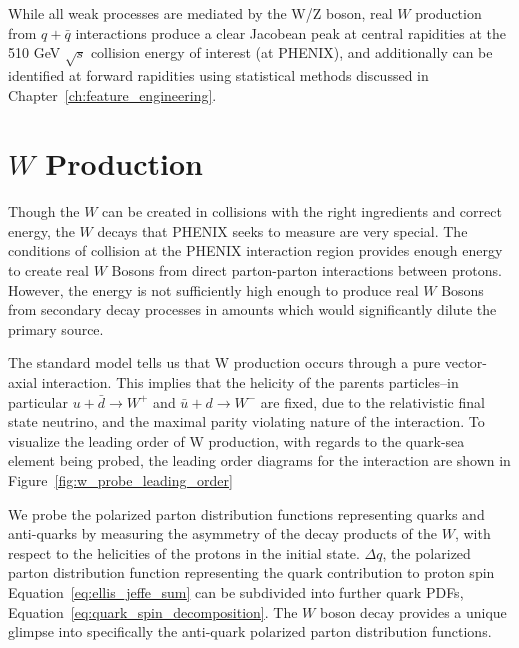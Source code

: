 While all weak processes are mediated by the W/Z boson, real $W$ production from
$q+\bar{q}$ interactions produce a clear Jacobean peak at central rapidities at
the 510 GeV $\sqrt{s}$ collision energy of interest (at PHENIX), and
additionally can be identified at forward rapidities using statistical methods
discussed in Chapter~\ref{ch:feature_engineering}.

\clearpage
\section{$W$ Production}

Though the $W$ can be created in collisions with the right ingredients and
correct energy, the $W$ decays that PHENIX seeks to measure are very special.
The conditions of collision at the PHENIX interaction region provides enough
energy to create real $W$ Bosons from direct parton-parton interactions between
protons. However, the energy is not sufficiently high enough to produce real $W$
Bosons from secondary decay processes in amounts which would significantly
dilute the primary source.

The standard model tells us that W production occurs through a pure vector-axial
interaction. This implies that the helicity of the parents particles--in
particular $u+\bar{d}\rightarrow W^+$ and $\bar{u}+d\rightarrow W^-$ are fixed,
due to the relativistic final state neutrino, and the maximal parity violating
nature of the interaction. To visualize the leading order of W production, with
regards to the quark-sea element being probed, the leading order diagrams for
the interaction are shown in
Figure~\ref{fig:w_probe_leading_order}~\cite{Aidala2005}

We probe the polarized parton distribution functions representing quarks and
anti-quarks by measuring the asymmetry of the decay products of the $W$,
with respect to the helicities of the protons in the initial state. $\Delta q$,
the polarized parton distribution function representing the quark contribution
to proton spin Equation~\ref{eq:ellis_jeffe_sum} can be subdivided into
further quark PDFs, Equation~\ref{eq:quark_spin_decomposition}. The $W$ boson
decay provides a unique glimpse into specifically the anti-quark polarized
parton distribution functions.

